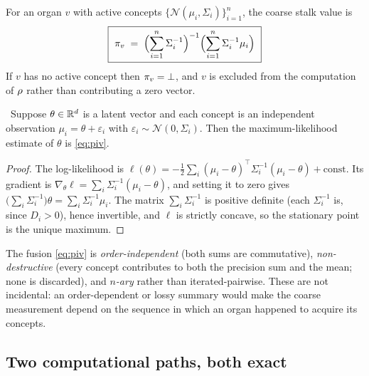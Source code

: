 \begin{construction}\label{con:piv}
For an organ $v$ with active concepts
$\{\mathcal N(\mu_i,\Sigma_i)\}_{i=1}^n$, the coarse stalk value is
\begin{equation}\label{eq:piv}
  \boxed{\ \pi_v\;=\;
  \Bigl(\sum_{i=1}^n\Sigma_i^{-1}\Bigr)^{-1}
  \Bigl(\sum_{i=1}^n\Sigma_i^{-1}\mu_i\Bigr)\ }
\end{equation}
If $v$ has no active concept then $\pi_v=\bot$, and $v$ is excluded from
the computation of $\rho$ rather than contributing a zero vector.
\end{construction}

\begin{proposition}\label{prop:pivmle}
\Proved\ Suppose $\theta\in\mathbb{R}^{d}$ is a latent vector and each concept is an
independent observation $\mu_i=\theta+\varepsilon_i$ with
$\varepsilon_i\sim\mathcal N(0,\Sigma_i)$. Then the maximum-likelihood
estimate of $\theta$ is \eqref{eq:piv}.
\end{proposition}
\begin{proof}
The log-likelihood is
$\ell(\theta)=-\tfrac12\sum_i(\mu_i-\theta)^\top\Sigma_i^{-1}(\mu_i-\theta)
+\text{const}$.
Its gradient is
$\nabla_\theta\ell=\sum_i\Sigma_i^{-1}(\mu_i-\theta)$, and setting it to
zero gives $\bigl(\sum_i\Sigma_i^{-1}\bigr)\theta=\sum_i\Sigma_i^{-1}\mu_i$.
The matrix $\sum_i\Sigma_i^{-1}$ is positive definite (each
$\Sigma_i^{-1}$ is, since $D_i>0$), hence invertible, and $\ell$ is
strictly concave, so the stationary point is the unique maximum.
\end{proof}

\begin{remark}
The fusion \eqref{eq:piv} is \emph{order-independent} (both sums are
commutative), \emph{non-destructive} (every concept contributes to both
the precision sum and the mean; none is discarded), and \emph{$n$-ary}
rather than iterated-pairwise. These are not incidental: an
order-dependent or lossy summary would make the coarse measurement
depend on the sequence in which an organ happened to acquire its
concepts.
\end{remark}

\subsection*{Two computational paths, both exact}

